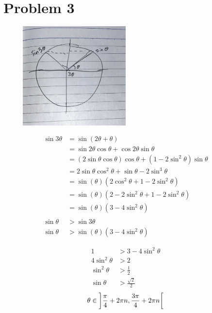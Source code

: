\documentclass{article}
\begin{document}
\section*{Problem 3}
\begin{figure}[h]
	\centering
	\includegraphics[width=0.5\textwidth]{ps36q3.jpg}
\end{figure}
\begin{align*}
	\sin3\theta&=\sin\left(2\theta+\theta\right) \\
	&=\sin2\theta\cos\theta+\cos2\theta\sin\theta \\
	&=\left(2\sin\theta\cos\theta\right)\cos\theta+
		\left(1-2\sin^2\theta\right)\sin\theta \\
	&=2\sin\theta\cos^2\theta+\sin\theta-2\sin^3\theta \\
	&=\sin\left(\theta\right)
		\left(2\cos^2\theta+1-2\sin^2\theta\right) \\
	&=\sin\left(\theta\right)
		\left(2-2\sin^2\theta+1-2\sin^2\theta\right) \\
	&=\sin\left(\theta\right)\left(3-4\sin^2\theta\right) \\
	\\
	\sin\theta&>\sin3\theta \\
	\sin\theta&>\sin\left(\theta\right)
		\left(3-4\sin^2\theta\right)
\end{align*}
\newpage
\begin{minipage}[t]{.5\textwidth}
	\begin{align*}
		1&>3-4\sin^2\theta \\
		4\sin^2\theta&>2 \\
		\sin^2\theta&>\frac{1}{2} \\
		\sin\theta&>\frac{\sqrt{2}}{2}
	\end{align*}
	\begin{gather*}
		\theta\in\interval[scaled,open left,open right]
		{\frac{\pi}{4}+2\pi n}{\frac{3\pi}{4}+2\pi n} \\
	\end{gather*}
	\vfill\null\pagebreak
\end{minipage}
\end{document}
